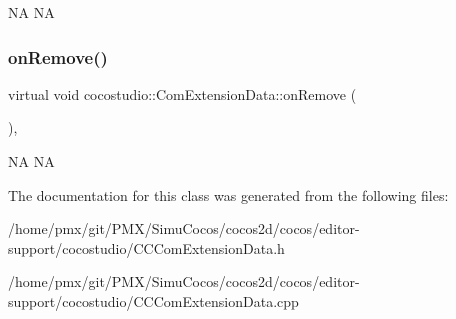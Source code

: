 NA  NA \mbox{\label{classcocostudio_1_1ComExtensionData_afca0501d8582030e815217309ba81a15}} 
\subsubsection{\texorpdfstring{on\+Remove()}{onRemove()}\hspace{0.1cm}{\footnotesize\ttfamily [2/2]}}
{\footnotesize\ttfamily virtual void cocostudio\+::\+Com\+Extension\+Data\+::on\+Remove (\begin{DoxyParamCaption}{ }\end{DoxyParamCaption})\hspace{0.3cm}{\ttfamily [override]}, {\ttfamily [virtual]}}

NA  NA 

The documentation for this class was generated from the following files\+:\begin{DoxyCompactItemize}
\item 
/home/pmx/git/\+P\+M\+X/\+Simu\+Cocos/cocos2d/cocos/editor-\/support/cocostudio/C\+C\+Com\+Extension\+Data.\+h\item 
/home/pmx/git/\+P\+M\+X/\+Simu\+Cocos/cocos2d/cocos/editor-\/support/cocostudio/C\+C\+Com\+Extension\+Data.\+cpp\end{DoxyCompactItemize}
